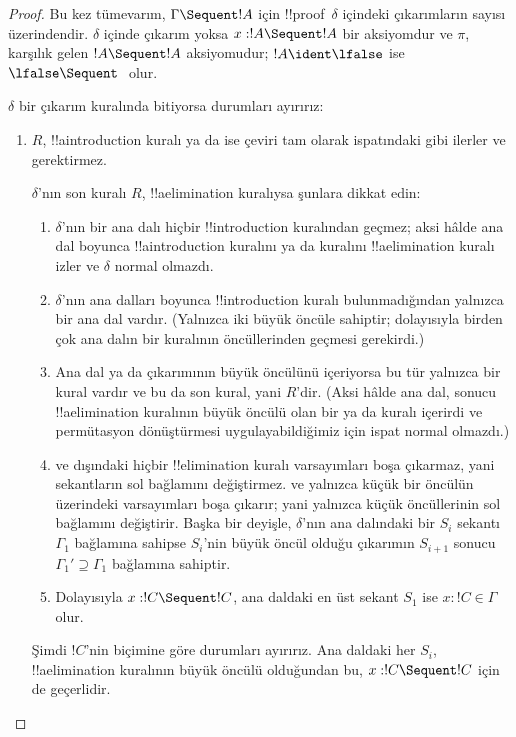 \begin{proof}
Bu kez tümevarım, $\Gamma \Sequent !A$ için !!{proof}~$\delta$ içindeki
çıkarımların sayısı üzerindendir. $\delta$ içinde çıkarım yoksa
$x:!A \Sequent !A$ bir aksiyomdur ve $\pi$, karşılık gelen $!A \Sequent
!A$ aksiyomudur; $!A \ident \lfalse$ ise $\lfalse \Sequent \ $ olur.

$\delta$ bir çıkarım kuralında bitiyorsa durumları ayırırız:
\begin{enumerate}
  \item $R$, !!a{introduction} kuralı ya da \FalseInt ise çeviri
  tam olarak  ispatındaki gibi ilerler
  ve \Cut{} gerektirmez.

  $\delta$'nın son kuralı $R$, !!a{elimination} kuralıysa şunlara
  dikkat edin:
  \begin{enumerate}
    \item $\delta$'nın bir ana dalı hiçbir !!{introduction} kuralından
    geçmez; aksi hâlde ana dal boyunca !!a{introduction} kuralını ya da
    \FalseInt{} kuralını !!a{elimination} kuralı izler ve $\delta$
    normal olmazdı.
    \item $\delta$'nın ana dalları boyunca !!{introduction} kuralı
    bulunmadığından yalnızca bir ana dal vardır. (Yalnızca
    \Intro{\land} iki büyük öncüle sahiptir; dolayısıyla birden çok ana
    dalın bir \Intro{\land} kuralının öncüllerinden geçmesi gerekirdi.)
    \item Ana dal \Elim{\lor} ya da \Elim{\lexists} çıkarımının büyük
    öncülünü içeriyorsa bu tür yalnızca bir kural vardır ve bu da son
    kural, yani $R$'dir. (Aksi hâlde ana dal, sonucu !!a{elimination}
    kuralının büyük öncülü olan bir \Elim{\lor} ya da \Elim{\lexists}
    kuralı içerirdi ve permütasyon dönüştürmesi uygulayabildiğimiz için
    ispat normal olmazdı.)
  \item \Elim{\lor} ve \Elim{\lexists} dışındaki hiçbir
  !!{elimination} kuralı varsayımları boşa çıkarmaz, yani sekantların
  sol bağlamını değiştirmez. \Elim{\lor} ve \Elim{\lexists}
  yalnızca küçük bir öncülün üzerindeki varsayımları boşa çıkarır; yani
  yalnızca küçük öncüllerinin sol bağlamını değiştirir. Başka bir
  deyişle, $\delta$'nın ana dalındaki bir $S_i$ sekantı
  $\Gamma_1$ bağlamına sahipse $S_i$'nin büyük öncül olduğu çıkarımın
  $S_{i+1}$ sonucu $\Gamma_1' \supseteq \Gamma_1$ bağlamına sahiptir.
  \item Dolayısıyla $x: !C \Sequent !C$, ana daldaki en üst sekant
  $S_1$ ise $x:!C \in \Gamma$ olur.
  \end{enumerate}
  Şimdi $!C$'nin biçimine göre durumları ayırırız. Ana daldaki her
  $S_i$, !!a{elimination} kuralının büyük öncülü olduğundan bu,
  $x:!C \Sequent !C$ için de geçerlidir.


\end{enumerate}
\end{proof}
